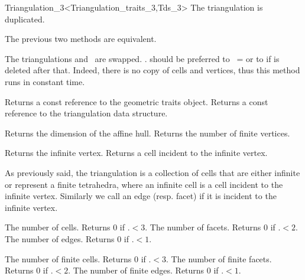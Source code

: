 \begin{ccRefClass}{Triangulation_3<Triangulation_traits_3,Tds_3>}
{The triangulation is duplicated.}

The previous two methods are equivalent.

{The triangulations  and \ccVar\ are swapped.
\ccVar. should be preferred to \ccVar\ =  or to
 if  is deleted after that. Indeed, there is no
copy of cells and vertices, thus this method runs in constant time.}

\ccAccessFunctions
{}

{Returns a const reference to the geometric traits object.}
\ccGlue
{}
{Returns a const reference to the triangulation data structure.}

{Returns the dimension of the affine hull.}
\ccGlue
{}
{Returns the number of finite vertices.}

{Returns the infinite vertex.}
\ccGlue
{}
{Returns a cell incident to the infinite vertex.}


As previously said, the triangulation is a collection of cells that
are either infinite or represent a finite tetrahedra, where an
infinite cell is a 
cell incident to the infinite vertex. Similarly we call
an edge (resp. facet)  if it is incident to the infinite vertex.

{The number of cells. Returns 0 if \ccVar.$<3$.}
\ccGlue
{}
{The number of facets. Returns 0 if \ccVar.$<2$.}
\ccGlue
{}
{The number of edges. Returns 0 if \ccVar.$<1$.}

{The number of finite cells. Returns 0 if \ccVar.$<3$.}
\ccGlue
{}
{The number of finite facets. Returns 0 if \ccVar.$<2$.}
\ccGlue
{}
{The number of finite edges. Returns 0 if \ccVar.$<1$.}


\end{ccRefClass}
